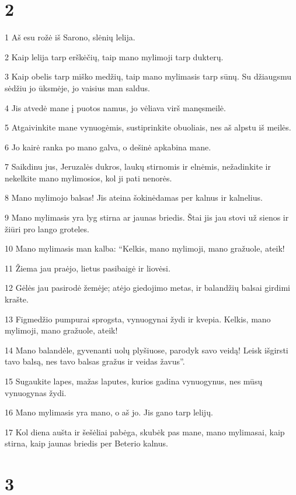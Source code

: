 \chapter{2}


\par 1 Aš esu rožė iš Sarono, slėnių lelija. 
\par 2 Kaip lelija tarp erškėčių, taip mano mylimoji tarp dukterų. 
\par 3 Kaip obelis tarp miško medžių, taip mano mylimasis tarp sūnų. Su džiaugsmu sėdžiu jo ūksmėje, jo vaisius man saldus. 
\par 4 Jis atvedė mane į puotos namus, jo vėliava virš manęs­meilė. 
\par 5 Atgaivinkite mane vynuogėmis, sustiprinkite obuoliais, nes aš alpstu iš meilės. 
\par 6 Jo kairė ranka po mano galva, o dešinė apkabina mane. 
\par 7 Saikdinu jus, Jeruzalės dukros, laukų stirnomis ir elnėmis, nežadinkite ir nekelkite mano mylimosios, kol ji pati nenorės. 
\par 8 Mano mylimojo balsas! Jis ateina šokinėdamas per kalnus ir kalnelius. 
\par 9 Mano mylimasis yra lyg stirna ar jaunas briedis. Štai jis jau stovi už sienos ir žiūri pro lango groteles. 
\par 10 Mano mylimasis man kalba: “Kelkis, mano mylimoji, mano gražuole, ateik! 
\par 11 Žiema jau praėjo, lietus pasibaigė ir liovėsi. 
\par 12 Gėlės jau pasirodė žemėje; atėjo giedojimo metas, ir balandžių balsai girdimi krašte. 
\par 13 Figmedžio pumpurai sprogsta, vynuogynai žydi ir kvepia. Kelkis, mano mylimoji, mano gražuole, ateik! 
\par 14 Mano balandėle, gyvenanti uolų plyšiuose, parodyk savo veidą! Leisk išgirsti tavo balsą, nes tavo balsas gražus ir veidas žavus”. 
\par 15 Sugaukite lapes, mažas laputes, kurios gadina vynuogynus, nes mūsų vynuogynas žydi. 
\par 16 Mano mylimasis yra mano, o aš jo. Jis gano tarp lelijų. 
\par 17 Kol diena aušta ir šešėliai pabėga, skubėk pas mane, mano mylimasai, kaip stirna, kaip jaunas briedis per Beterio kalnus.



\chapter{3}


